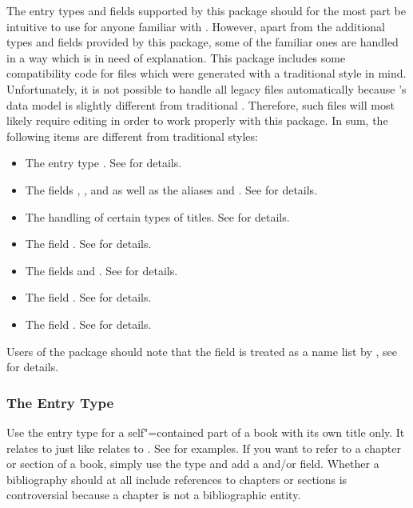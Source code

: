 \documentclass{ltxdockit}[2011/03/25]
\begin{document}
The entry types and fields supported by this package should for the most part be intuitive to use for anyone familiar with \bibtex. However, apart from the additional types and fields provided by this package, some of the familiar ones are handled in a way which is in need of explanation.
This package includes some compatibility code for  files which were generated with a traditional \bibtex style in mind. Unfortunately, it is not possible to handle all legacy files automatically because 's data model is slightly different from traditional \bibtex. Therefore, such  files will most likely require editing in order to work properly with this package. In sum, the following items are different from traditional \bibtex styles:

\begin{itemize}
\setlength{\itemsep}{0pt}
\item The entry type . See  for details.
\item The fields , , and  as well as the aliases  and . See  for details.
\item The handling of certain types of titles. See  for details.
\item The field . See  for details.
\item The fields  and . See  for details.
\item The field . See  for details.
\item The field . See  for details.
\end{itemize}

Users of the  package should note that the  field is treated as a name list by , see  for details.

\subsubsection{The Entry Type }
\label{bib:use:inb}

Use the  entry type for a self"=contained part of a book with its own title only. It relates to  just like  relates to . See  for examples. If you want to refer to a chapter or section of a book, simply use the  type and add a  and\slash or  field. Whether a bibliography should at all include references to chapters or sections is controversial because a chapter is not a bibliographic entity.
\end{document}
